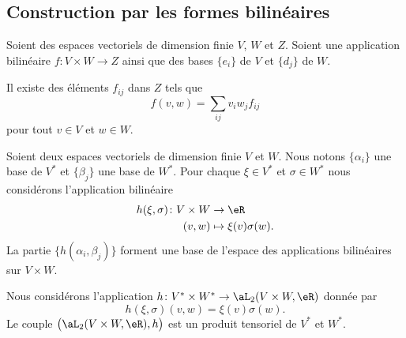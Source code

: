\subsection{Construction par les formes bilinéaires}

\begin{lemma}		\label{LEMooCXPRooGfJMMV}
	Soient des espaces vectoriels de dimension finie \( V\), \( W\) et \( Z\). Soient une application bilinéaire \(f \colon V\times W\to Z  \) ainsi que des bases \( \{ e_i \}\) de \( V\) et \( \{ d_j \}\) de \( W\).

	Il existe des éléments \( f_{ij}\) dans \( Z\) tels que
	\begin{equation}
		f(v,w)=\sum_{ij}v_iw_jf_{ij}
	\end{equation}
	pour tout \( v\in V\) et \( w\in W\).
\end{lemma}

\begin{lemma}		\label{LEMooPBLRooJePqlk}
	Soient deux espaces vectoriels de dimension finie \( V\) et \( W\). Nous notons \( \{ \alpha_i \}\) une base de \( V^*\) et \( \{ \beta_j \}\) une base de \( W^*\). Pour chaque \( \xi\in V^*\) et \( \sigma\in W^*\) nous considérons l'application bilinéaire
	\begin{equation}
		\begin{aligned}
			h(\xi,\sigma)\colon V\times W & \to \eR                  \\
			(v,w)                         & \mapsto \xi(v)\sigma(w).
		\end{aligned}
	\end{equation}
	La partie \( \{ h(\alpha_i,\beta_j) \}\) forment une base de l'espace des applications bilinéaires sur \( V\times W\).
\end{lemma}

\begin{proposition}		\label{PROPooIFVBooGiMskq}
	Nous considérons l'application \(h \colon V^*\times W^*\to \aL_2(V\times W,\eR)  \) donnée par
	\begin{equation}
		h(\xi,\sigma)(v,w)=\xi(v)\sigma(w).
	\end{equation}
	Le couple \( \big( \aL_2(V\times W,\eR),h \big)\) est un produit tensoriel de \( V^*\) et \( W^*\).
\end{proposition}

